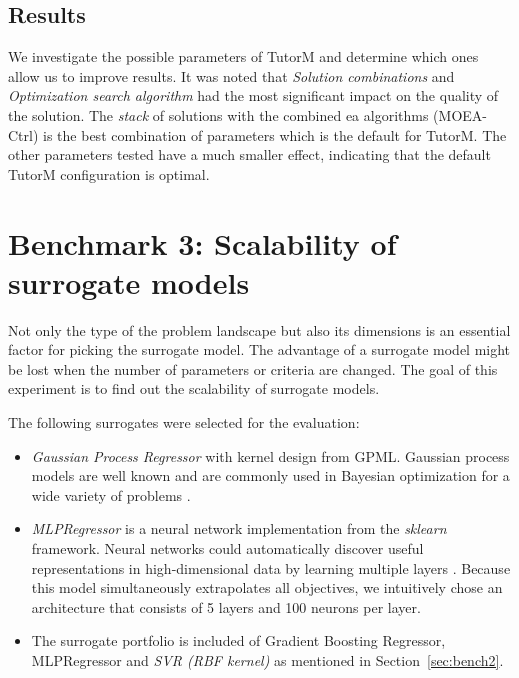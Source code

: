     \subsection*{Results}
    We investigate the possible parameters of TutorM and determine which ones allow us to improve results. It was noted that \emph{Solution combinations} and \emph{Optimization search algorithm} had the most significant impact on the quality of the solution. The \emph{stack} of solutions with the combined \gls{ea} algorithms (MOEA-Ctrl) is the best combination of parameters which is the default for TutorM. 
    The other parameters tested have a much smaller effect, indicating that the default TutorM configuration is optimal.


\section{Benchmark 3: Scalability of surrogate models}
    Not only the type of the problem landscape but also its dimensions is an essential factor for picking the surrogate model. The advantage of a surrogate model might be lost when the number of parameters or criteria are changed. The goal of this experiment is to find out the scalability of surrogate models. 

    The following surrogates were selected for the evaluation:
    \begin{itemize}
        \item \emph{Gaussian Process Regressor} with kernel design from GPML\cite{RasmussenN10}. Gaussian process models are well known and are commonly used in Bayesian optimization for a wide variety of problems \cite{EmmerichGN06, MlakarPTF15}. 
        \item \emph{MLPRegressor} is a neural network implementation from the \textit{sklearn} framework. Neural networks could automatically discover useful representations in high-dimensional data by learning multiple layers \cite{WilsonHSX16}. Because this model simultaneously extrapolates all objectives, we intuitively chose an architecture that consists of 5 layers and 100 neurons per layer.
        \item The surrogate portfolio is included of Gradient Boosting Regressor, MLPRegressor and \emph{SVR (RBF kernel)} as mentioned in Section~\ref{sec:bench2}.
    \end{itemize}

